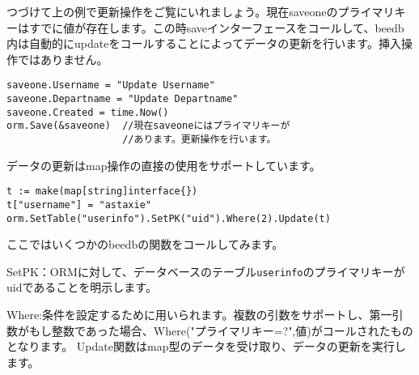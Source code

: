 つづけて上の例で更新操作をご覧にいれましょう。現在saveoneのプライマリキーはすでに値が存在します。この時saveインターフェースをコールして、beedb内は自動的にupdateをコールすることによってデータの更新を行います。挿入操作ではありません。

\begin{lstlisting}[numbers=none]
saveone.Username = "Update Username"
saveone.Departname = "Update Departname"
saveone.Created = time.Now()
orm.Save(&saveone)  //現在saveoneにはプライマリキーが
                    //あります。更新操作を行います。
\end{lstlisting}

データの更新はmap操作の直接の使用をサポートしています。

\begin{lstlisting}[numbers=none]
t := make(map[string]interface{})
t["username"] = "astaxie"
orm.SetTable("userinfo").SetPK("uid").Where(2).Update(t)
\end{lstlisting}

ここではいくつかのbeedbの関数をコールしてみます。

SetPK：ORMに対して、データベースのテーブル\texttt{userinfo}のプライマリキーがuidであることを明示します。

Where:条件を設定するために用いられます。複数の引数をサポートし、第一引数がもし整数であった場合、Where("プライマリキー=?",値)がコールされたものとなります。 Update関数はmap型のデータを受け取り、データの更新を実行します。

